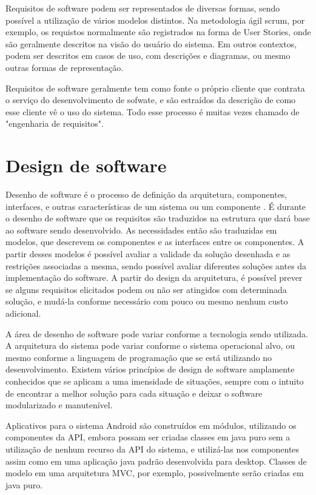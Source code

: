 Requisitos de software podem ser representados de diversas formas, sendo possível a utilização de vários modelos distintos. Na metodologia ágil scrum, por exemplo, os requistos normalmente são registrados na forma de User Stories, onde são geralmente descritos na visão do usuário do sistema. Em outros contextos, podem ser descritos em casos de uso, com descrições e diagramas, ou mesmo outras formas de representação.

Requisitos de software geralmente tem como fonte o próprio cliente que contrata o serviço do desenvolvimento de sofwate, e são estraídos da descrição de como esse cliente vê o uso do sistema. Todo esse processo é muitas vezes chamado de "engenharia de requisitos".

\section{Design de software}

Desenho de software é o processo de definição da arquitetura, componentes, interfaces, e outras características de um sistema ou um componente \cite{swebok}. É durante o desenho de software que os requisitos são traduzidos na estrutura que dará base ao software sendo desenvolvido. As necessidades então são traduzidas em modelos, que descrevem os componentes e as interfaces entre os componentes. A partir desses modelos é possível avaliar a validade da solução desenhada e as restrições associadas a mesma, sendo possível avaliar diferentes soluções antes da implementação do software. A partir do design da arquitetura, é possível prever se alguns requisitos elicitados podem ou não ser atingidos com determinada solução, e mudá-la conforme necessário com pouco ou mesmo nenhum custo adicional.

A área de desenho de software pode variar conforme a tecnologia sendo utilizada. A arquitetura do sistema pode variar conforme o sistema operacional alvo, ou mesmo conforme a linguagem de programação que se está utilizando no desenvolvimento. Existem vários princípios de design de software amplamente conhecidos que se aplicam a uma imensidade de situações, sempre com o intuito de encontrar a melhor solução para cada situação e deixar o software modularizado e manutenível.

Aplicativos para o sistema Android são construídos em módulos, utilizando os componentes da API, embora possam ser criadas classes em java puro sem a utilização de nenhum recurso da API do sistema, e utilizá-las nos componentes assim como em uma aplicação java padrão desenvolvida para desktop. Classes de modelo em uma arquitetura MVC, por exemplo, possivelmente serão criadas em java puro.

